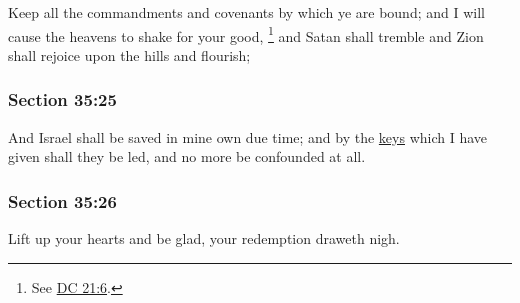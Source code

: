 		Keep all the commandments and covenants by which ye are bound; and I will cause the heavens to shake for your good,%
			\footnote{%
				See \hyperref[DC21-6]{DC 21:6}.
				}
		and Satan shall tremble and Zion shall rejoice upon the hills and flourish;


	\subsubsection{Section 35:25} %
		\label{DC35-25}

		And Israel shall be saved in mine own due time; and by the \hyperref[KEY]{keys} which I have given shall they be led, and no more be confounded at all.


	\subsubsection{Section 35:26} %
		\label{DC35-26}

		Lift up your hearts and be glad, your redemption draweth nigh.


